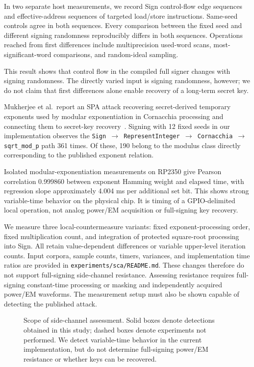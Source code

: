 \documentclass[a4paper,10pt]{article}
\theoremstyle{definition}
\theoremstyle{remark}
\begin{document}
In two separate host measurements, we record Sign control-flow edge sequences and effective-address sequences of targeted load/store instructions. Same-seed controls agree in both sequences. Every comparison between the fixed seed and different signing randomness reproducibly differs in both sequences. Operations reached from first differences include multiprecision used-word scans, most-significant-word comparisons, and random-ideal sampling.

This result shows that control flow in the compiled full signer changes with signing randomness. The directly varied input is signing randomness, however; we do not claim that first differences alone enable recovery of a long-term secret key.

Mukherjee et al.\ report an SPA attack recovering secret-derived temporary exponents used by modular exponentiation in Cornacchia processing and connecting them to secret-key recovery~\cite{spa-2025}. Signing with 12 fixed seeds in our implementation observes the \texttt{Sign $\rightarrow$ RepresentInteger $\rightarrow$ Cornacchia $\rightarrow$ sqrt\_mod\_p} path 361 times. Of these, 190 belong to the modulus class directly corresponding to the published exponent relation.

Isolated modular-exponentiation measurements on RP2350 give Pearson correlation \num{0.999860} between exponent Hamming weight and elapsed time, with regression slope approximately \num{4.004} ms per additional set bit. This shows strong variable-time behavior on the physical chip. It is timing of a GPIO-delimited local operation, not analog power/EM acquisition or full-signing key recovery.

We measure three local-countermeasure variants: fixed exponent-processing order, fixed multiplication count, and integration of protected square-root processing into Sign. All retain value-dependent differences or variable upper-level iteration counts. Input corpora, sample counts, timers, variances, and implementation time ratios are provided in \texttt{experiments/sca/README.md}. These changes therefore do not support full-signing side-channel resistance. Assessing resistance requires full-signing constant-time processing or masking and independently acquired power/EM waveforms. The measurement setup must also be shown capable of detecting the published attack.

\begin{figure}[H]
  \centering
  
  \caption{Scope of side-channel assessment. Solid boxes denote detections obtained in this study; dashed boxes denote experiments not performed. We detect variable-time behavior in the current implementation, but do not determine full-signing power/EM resistance or whether keys can be recovered.}
  \label{fig:sca-evidence}
\end{figure}
\end{document}
